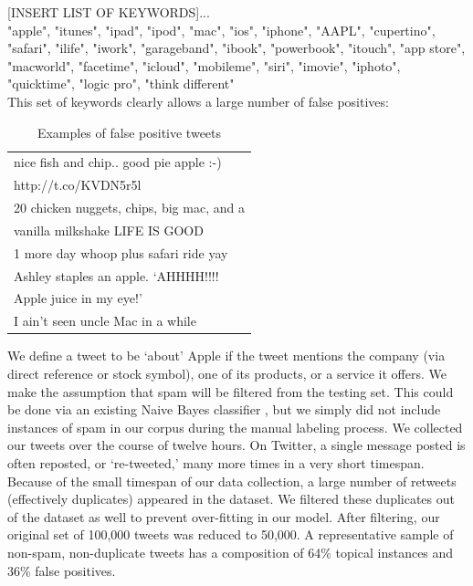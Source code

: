 \documentclass[letterpaper]{article}
\begin{document}
[INSERT LIST OF KEYWORDS]...\\
"apple", "itunes", "ipad", "ipod", "mac", "ios", "iphone", "AAPL", "cupertino", "safari", "ilife", "iwork", "garageband", "ibook", "powerbook", "itouch", "app store", "macworld", "facetime", "icloud", "mobileme", "siri", "imovie", "iphoto", "quicktime", "logic pro", "think different" \\

This set of keywords clearly allows a large number of false positives:

\begin{table}[h]
\centering
\begin{tabular}{|l|}
	\hline
	nice fish and chip.. good pie apple :-) \\ http://t.co/KVDN5r5l \\ \hline
	20 chicken nuggets, chips, big mac, and a \\ vanilla milkshake LIFE IS GOOD \\ \hline
	1 more day whoop plus safari ride yay \\ \hline
	Ashley staples an apple.  `AHHHH!!!! \\ Apple juice in my eye!' \\ \hline
	I ain't seen uncle Mac in a while \\
	\hline
\end{tabular}
\caption{Examples of false positive tweets}
\label{tab:myfirsttable}
\end{table}


We define a tweet to be `about' Apple if the tweet mentions the company (via direct reference or stock symbol), one of its products, or a service it offers. We make the assumption that spam will be filtered from the testing set. This could be done via an existing Naive Bayes classifier %
, but we simply did not include instances of spam in our corpus during the manual labeling process. We collected our tweets over the course of twelve hours. On Twitter, a single message posted is often reposted, or `re-tweeted,' many more times in a very short timespan. Because of the small timespan of our data collection, a large number of retweets (effectively duplicates) appeared in the dataset. We filtered these duplicates out of the dataset as well to prevent over-fitting in our model. After filtering, our original set of 100,000 tweets was reduced to 50,000. A representative sample of non-spam, non-duplicate tweets has a composition of 64\% topical instances and 36\% false positives.
\end{document}
